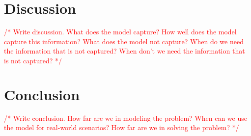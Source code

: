 \documentclass[conference]{IEEEtran}
\newcommand{\todo}[1]{\textcolor{red}{/* #1 */}}
\begin{document}
	\section{Discussion}
	\label{discussion}
	
	\todo{Write discussion. What does the model capture? How well does the model capture this information? What does the model not capture? When do we need the information that is not captured? When don't we need the information that is not captured?}
	
	\section{Conclusion}
	\label{conclusion}
	
	\todo{Write conclusion. How far are we in modeling the problem? When can we use the model for real-world scenarios? How far are we in solving the problem?}
	
	
	
	
\end{document}
